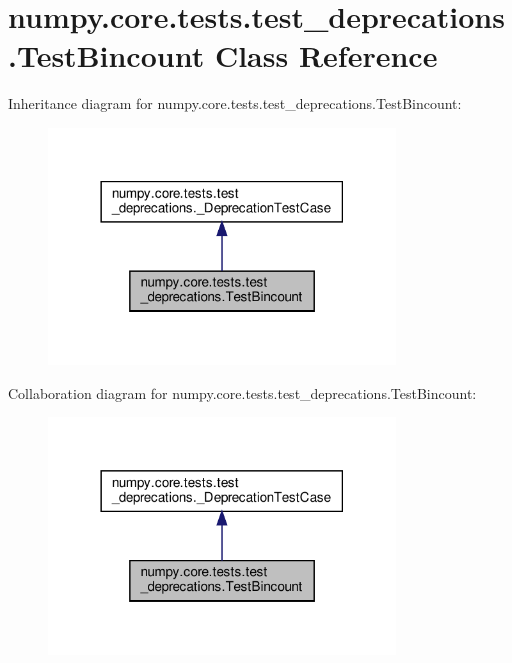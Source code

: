 \hypertarget{classnumpy_1_1core_1_1tests_1_1test__deprecations_1_1TestBincount}{}\section{numpy.\+core.\+tests.\+test\+\_\+deprecations.\+Test\+Bincount Class Reference}
\label{classnumpy_1_1core_1_1tests_1_1test__deprecations_1_1TestBincount}


Inheritance diagram for numpy.\+core.\+tests.\+test\+\_\+deprecations.\+Test\+Bincount\+:
\nopagebreak
\begin{figure}[H]
\begin{center}
\leavevmode
\includegraphics[width=261pt]{classnumpy_1_1core_1_1tests_1_1test__deprecations_1_1TestBincount__inherit__graph}
\end{center}
\end{figure}


Collaboration diagram for numpy.\+core.\+tests.\+test\+\_\+deprecations.\+Test\+Bincount\+:
\nopagebreak
\begin{figure}[H]
\begin{center}
\leavevmode
\includegraphics[width=261pt]{classnumpy_1_1core_1_1tests_1_1test__deprecations_1_1TestBincount__coll__graph}
\end{center}
\end{figure}
